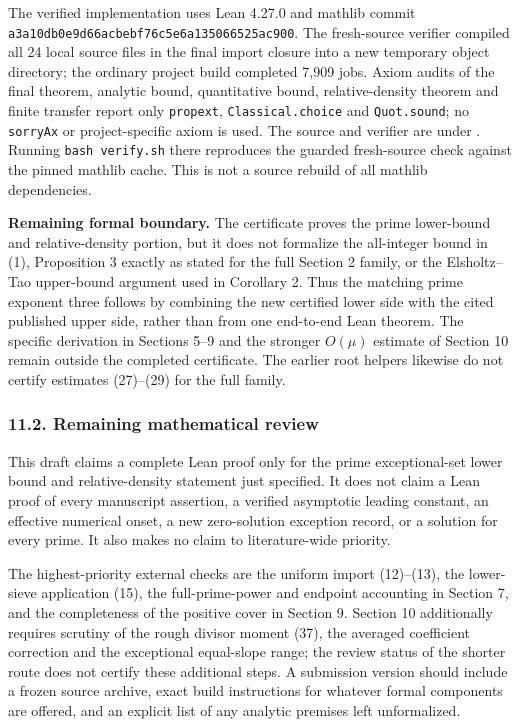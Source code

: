 \documentclass[
  english,
  11pt,
]{article}
\begin{document}
The verified implementation uses Lean 4.27.0 and mathlib commit
\texttt{a3a10db0e9d66acb}\allowbreak\texttt{ebf76c5e6a135066525ac900}. The fresh-source
verifier compiled all 24 local source files in the final import closure
into a new temporary object directory; the ordinary project build
completed 7,909 jobs. Axiom audits of the final theorem, analytic bound,
quantitative bound, relative-density theorem and finite transfer report
only \texttt{propext}, \texttt{Classical.choice} and \texttt{Quot.sound};
no \texttt{sorryAx} or project-specific axiom is used. The source and
verifier are under
. Running
\texttt{bash verify.sh} there reproduces the guarded fresh-source check
against the pinned mathlib cache. This is not a source rebuild of all
mathlib dependencies.

\textbf{Remaining formal boundary.} The certificate proves the prime
lower-bound and relative-density portion, but it does not formalize the
all-integer bound in (1), Proposition 3 exactly as stated for the full
Section 2 family, or the Elsholtz--Tao upper-bound argument used in
Corollary 2. Thus the matching prime exponent three follows by combining
the new certified lower side with the cited published upper side, rather
than from one end-to-end Lean theorem. The specific derivation in
Sections 5--9 and the stronger \(O(\mu)\) estimate of Section 10 remain
outside the completed certificate. The earlier root helpers likewise do
not certify estimates (27)--(29) for the full family.

\subsubsection{11.2. Remaining mathematical
review}\label{remaining-mathematical-review}

This draft claims a complete Lean proof only for the prime exceptional-set
lower bound and relative-density statement just specified. It does not
claim a Lean proof of every manuscript assertion, a verified asymptotic
leading constant, an effective numerical onset, a new zero-solution
exception record, or a solution for every prime. It also makes no claim
to literature-wide priority.

The highest-priority external checks are the uniform import (12)--(13),
the lower-sieve application (15), the full-prime-power and endpoint
accounting in Section 7, and the completeness of the positive cover in
Section 9. Section 10 additionally requires scrutiny of the rough
divisor moment (37), the averaged coefficient correction and the
exceptional equal-slope range; the review status of the shorter route
does not certify these additional steps. A submission version should
include a frozen source archive, exact build instructions for whatever
formal components are offered, and an explicit list of any analytic
premises left unformalized.
\end{document}
